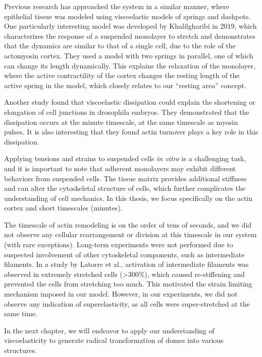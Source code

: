 Previous research has approached the system in a similar manner, where
epithelial tissue was modeled using viscoelastic models of springs and
dashpots. One particularly interesting model was developed by
Khalilgharibi in 2019, which characterizes the response of a suspended
monolayer to stretch and demonstrates that the dynamics are similar to
that of a single cell, due to the role of the actomyosin cortex. They
used a model with two springs in parallel, one of which can change its
length dynamically. This explains the relaxation of the monolayer, where
the active contractility of the cortex changes the resting length of the
active spring in the model, which closely relates to our ``resting
area'' concept.

Another study found that viscoelastic dissipation could explain the
shortening or elongation of cell junctions in drosophila embryos. They
demonstrated that the dissipation occurs at the minute timescale, at the
same timescale as myosin pulses. It is also interesting that they found
actin turnover plays a key role in this dissipation.

Applying tensions and strains to suspended cells \textit{in vitro} is a
challenging task, and it is important to note that adherent monolayers
may exhibit different behaviors from suspended cells. The tissue matrix
provides additional stiffness and can alter the cytoskeletal structure
of cells, which further complicates the understanding of cell mechanics.
In this thesis, we focus specifically on the actin cortex and short
timescales (minutes).

The timescale of actin remodeling is on the order of tens of seconds,
and we did not observe any cellular rearrangement or division at this
timescale in our system (with rare exceptions). Long-term experiments
were not performed due to suspected involvement of other cytoskeletal
components, such as intermediate filaments. In a study by Latorre et
al., activation of intermediate filaments was observed in extremely
stretched cells (\textgreater300\%), which caused re-stiffening and
prevented the cells from stretching too much. This motivated the strain
limiting mechanism imposed in our model. However, in our experiments, we
did not observe any indication of superelasticity, as all cells were
super-stretched at the same time.

In the next chapter, we will endeavor to apply our understanding of
viscoelasticity to generate radical transformation of domes into various
structures.
